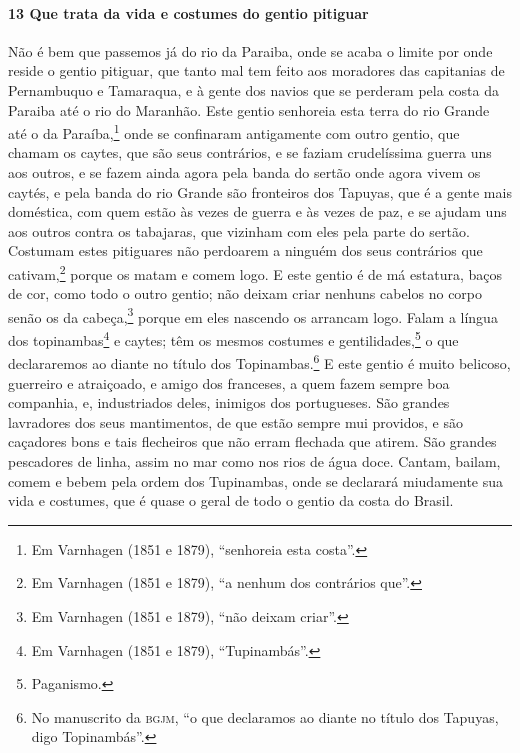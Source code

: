 \begin{linenumbers}
\paragraph{13 Que trata da vida e costumes do gentio pitiguar} \quad
Não é bem que passemos já do rio da Paraiba, onde se acaba o limite por onde reside o
gentio pitiguar, que tanto mal tem feito aos moradores das capitanias de Pernambuquo e
Tamaraqua, e à gente dos navios que se perderam pela costa da Paraiba até o rio do
Maranhão. Este gentio senhoreia esta terra do rio Grande até o da Paraíba,\footnote{ Em
Varnhagen (1851 e 1879), ``senhoreia esta costa''.} onde se confinaram antigamente com
outro gentio, que chamam os caytes, que são seus contrários, e se faziam crudelíssima
guerra uns aos outros, e se fazem ainda agora pela banda do sertão onde agora vivem os
caytés, e pela banda do rio Grande são fronteiros dos Tapuyas, que é a gente mais
doméstica, com quem estão às vezes de guerra e às vezes de paz, e se ajudam uns aos outros
contra os tabajaras, que vizinham com eles pela parte do sertão. Costumam estes pitiguares
não perdoarem a ninguém dos seus contrários que cativam,\footnote{ Em Varnhagen (1851 e
1879), ``a nenhum dos contrários que''.} porque os matam e comem logo. E este gentio é de
má estatura, baços de cor, como todo o outro gentio; não deixam criar nenhuns cabelos no
corpo senão os da cabeça,\footnote{ Em Varnhagen (1851 e 1879), ``não deixam criar''.}
porque em eles nascendo os arrancam logo. Falam a língua dos topinambas\footnote{ Em
Varnhagen (1851 e 1879), ``Tupinambás''.} e caytes; têm os mesmos costumes e
gentilidades,\footnote{ Paganismo.} o que declararemos ao diante no título dos
Topinambas.\footnote{ No manuscrito da \textsc{bgjm}, ``o que declaramos ao diante no
título dos Tapuyas, digo Topinambás''.} E este gentio é muito belicoso, guerreiro e
atraiçoado, e amigo dos franceses, a quem fazem sempre boa companhia, e, industriados
deles, inimigos dos portugueses. São grandes lavradores dos seus mantimentos, de que estão
sempre mui providos, e são caçadores bons e tais flecheiros que não erram flechada que
atirem. São grandes pescadores de linha, assim no mar como nos rios de água doce. Cantam,
bailam, comem e bebem pela ordem dos Tupinambas, onde se declarará miudamente sua vida e
costumes, que é quase o geral de todo o gentio da costa do Brasil.


\end{linenumbers}
